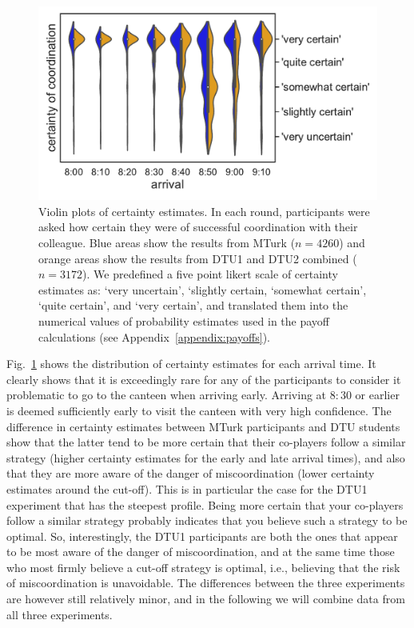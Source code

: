 \documentclass[twocolumn,a4paper,superscriptaddress,nofootinbib]{revtex4}
\newcommand{\tobo}[1]{{\color{red} TOBO: #1}}
\newcommand{\tsn}[1]{{\color{blue} TSN: #1}}
\newcommand{\re}[1]{{\color{brown} RE: #1}}
\begin{document}
\begin{figure} %
\centering\includegraphics[width=0.8\linewidth]{fig2_certainties}
\caption{Violin plots of certainty estimates. In each round, participants were asked how certain they were of successful coordination with their colleague. Blue areas show the results from MTurk ($n=4260$) and orange areas show the results from DTU1 and DTU2 combined ($n=3172$). We predefined a five point likert scale of certainty estimates as: `very uncertain', `slightly certain, `somewhat certain', `quite certain', and `very certain', and translated them into the numerical values of probability estimates used in the payoff calculations (see Appendix~\ref{appendix:payoffs}).}
\label{fig:certain}
\end{figure}
Fig.~\ref{fig:certain} shows the distribution of certainty estimates for each arrival time. It clearly shows that it is exceedingly rare for any of the participants to consider it problematic to go to the canteen when arriving early. Arriving at $8{:}30$ or earlier is deemed sufficiently early to visit the canteen with very high confidence. %
The difference in certainty estimates between MTurk participants and DTU students show that the latter tend to be more certain that their co-players follow a similar strategy (higher certainty estimates for the early and late arrival times), and also that they are more aware of the danger of miscoordination (lower certainty estimates around the cut-off). This is in particular the case for the DTU1 experiment that has the steepest profile. Being more certain that your co-players follow a similar strategy probably indicates that you believe such a strategy to be optimal. So, interestingly, the DTU1 participants are both the ones that appear to be most aware of the danger of miscoordination, and at the same time those who most firmly believe a cut-off strategy is optimal, i.e., believing that the risk of miscoordination is unavoidable. The differences between the three experiments are however still relatively minor, and in the following we will combine data from all three experiments.
\end{document}
